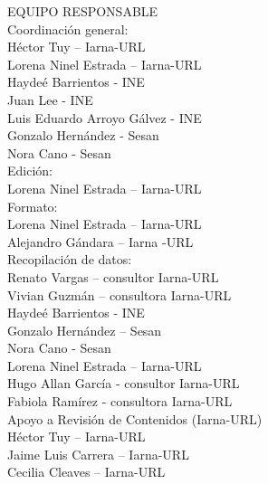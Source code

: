 \begin{center}
	{\Bold \LARGE EQUIPO RESPONSABLE}\\[2cm]
	
	{\Bold \large \color{color1!89!black} Coordinación general:}\\[0.2cm]

Héctor Tuy – Iarna-URL\\
Lorena Ninel Estrada – Iarna-URL\\
Haydeé Barrientos - INE\\
Juan Lee - INE\\
Luis Eduardo Arroyo Gálvez - INE\\
Gonzalo Hernández - Sesan\\
Nora Cano - Sesan\\[0.8cm]

	{\Bold \large \color{color1!89!black} Edición:}\\[0.2cm]
Lorena Ninel Estrada – Iarna-URL\\[0.8cm]


	{\Bold \large \color{color1!89!black} Formato:}\\[0.2cm]

Lorena Ninel Estrada – Iarna-URL\\
Alejandro Gándara – Iarna -URL\\[0.8cm]

	{\Bold \large \color{color1!89!black} Recopilación de datos:}\\[0.2cm]
Renato Vargas – consultor Iarna-URL\\
Vivian Guzmán – consultora Iarna-URL\\
Haydeé Barrientos - INE\\
Gonzalo Hernández – Sesan\\
Nora Cano - Sesan\\
Lorena Ninel Estrada – Iarna-URL\\
Hugo Allan García - consultor Iarna-URL\\
Fabiola Ramírez - consultora Iarna-URL\\[0.8cm]

	{\Bold \large \color{color1!89!black} Apoyo a Revisión de Contenidos (Iarna-URL)}\\[0.2cm]

Héctor Tuy – Iarna-URL\\
Jaime Luis Carrera – Iarna-URL\\
Cecilia Cleaves – Iarna-URL\\[0.8cm]
	
	
\end{center}\setcounter{page}{0}\cleardoublepage

